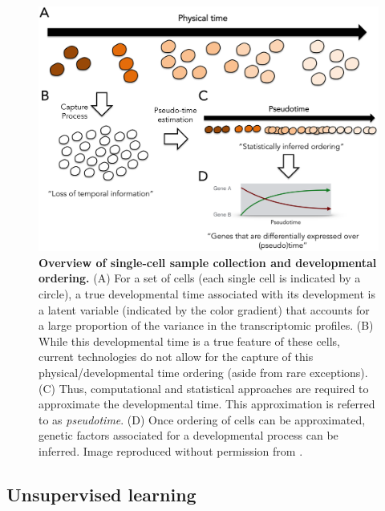 \documentclass[english, 11pt]{article}\usepackage[]{graphicx}\usepackage[]{color}
\begin{document}
\begin{figure}[H]
\begin{center}
\includegraphics[scale=1.0]{images/fig1campbell.png}
\end{center}
\caption{\textbf{Overview of single-cell sample collection and developmental ordering.} (A) For a set of cells (each single cell is indicated by a circle), a true developmental time associated with its development is a latent variable (indicated by the color gradient) that accounts for a large proportion of the variance in the transcriptomic profiles. (B) While this developmental time is a true feature of these cells, current technologies do not allow for the capture of this physical/developmental time ordering (aside from rare exceptions). (C) Thus, computational and statistical approaches are required to approximate the developmental time. This approximation is referred to as \textit{pseudotime}. (D) Once ordering of cells can be approximated, genetic factors associated for a developmental process can be inferred. Image reproduced without permission from \cite{campbell2016order}. }
\end{figure}


\subsection{Unsupervised learning}
\end{document}
